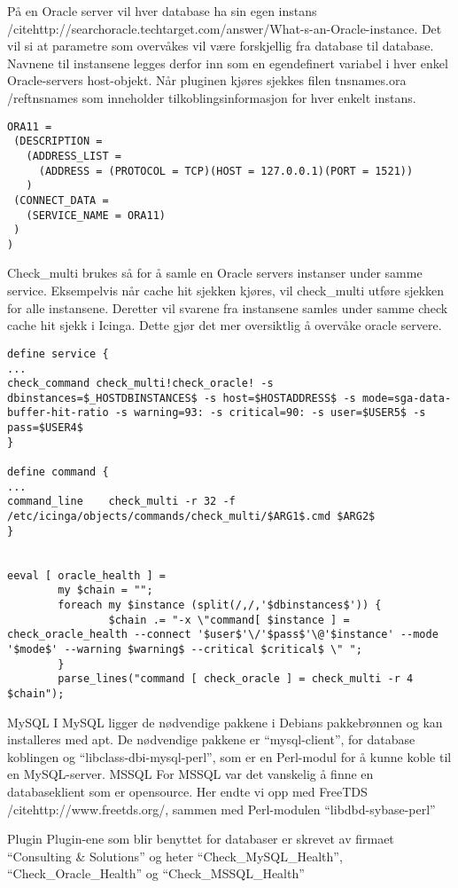På en Oracle server vil hver database ha sin egen instans /cite{http://searchoracle.techtarget.com/answer/What-s-an-Oracle-instance}. Det vil si at parametre som overvåkes vil være forskjellig fra database til database. Navnene til instansene legges derfor inn som en egendefinert variabel i hver enkel Oracle-servers host-objekt. Når pluginen kjøres sjekkes filen tnsnames.ora /ref{tnsnames} som inneholder tilkoblingsinformasjon for hver enkelt instans.
\begin{lstlisting}
ORA11 =
 (DESCRIPTION = 
   (ADDRESS_LIST =
     (ADDRESS = (PROTOCOL = TCP)(HOST = 127.0.0.1)(PORT = 1521))
   )
 (CONNECT_DATA =
   (SERVICE_NAME = ORA11)
 )
)
\end{lstlisting}
Check\_multi brukes så for å samle en Oracle servers instanser under samme service. Eksempelvis når cache hit sjekken kjøres, vil check\_multi utføre sjekken for alle instansene. Deretter vil svarene fra instansene samles under samme check cache hit sjekk i Icinga. Dette gjør det mer oversiktlig å overvåke oracle servere.

\begin{lstlisting}
define service {
...
check_command check_multi!check_oracle! -s dbinstances=$_HOSTDBINSTANCES$ -s host=$HOSTADDRESS$ -s mode=sga-data-buffer-hit-ratio -s warning=93: -s critical=90: -s user=$USER5$ -s pass=$USER4$
}

define command {
...
command_line	check_multi -r 32 -f /etc/icinga/objects/commands/check_multi/$ARG1$.cmd $ARG2$
}


eeval [ oracle_health ] =
    	my $chain = "";
    	foreach my $instance (split(/,/,'$dbinstances$')) {
            	$chain .= "-x \"command[ $instance ] = check_oracle_health --connect '$user$'\/'$pass$'\@'$instance' --mode '$mode$' --warning $warning$ --critical $critical$ \" ";
    	}
    	parse_lines("command [ check_oracle ] = check_multi -r 4 $chain");

\end{lstlisting}

MySQL
I MySQL ligger de nødvendige pakkene i Debians pakkebrønnen og kan installeres med apt. De nødvendige pakkene er “mysql-client”, for database koblingen og “libclass-dbi-mysql-perl”, som er en Perl-modul for å kunne koble til en MySQL-server. 
MSSQL
For MSSQL var det vanskelig å finne en databaseklient som er opensource. Her endte vi opp med FreeTDS /cite{http://www.freetds.org/}, sammen med Perl-modulen “libdbd-sybase-perl”

Plugin
Plugin-ene som blir benyttet for databaser er skrevet av firmaet “Consulting \& Solutions” og heter “Check\_MySQL\_Health”, “Check\_Oracle\_Health” og “Check\_MSSQL\_Health” 

